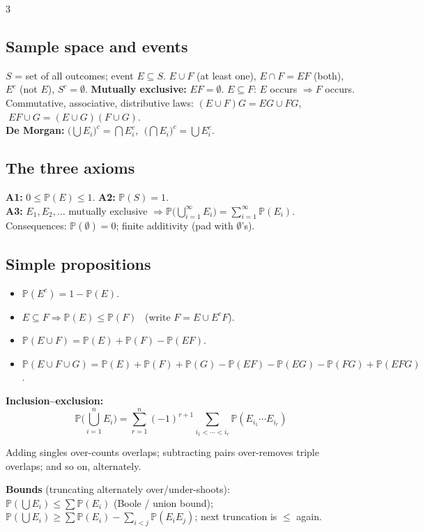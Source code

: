 \documentclass[8pt]{extarticle}
\newcommand{\PP}{\mathbb{P}}
\begin{document}
\begin{multicols*}{3}
\subsection{Sample space and events}
$S$ = set of all outcomes; event $E\subseteq S$. $E\cup F$ (at least one), $E\cap F=EF$ (both), $E^c$ (not $E$), $S^c=\emptyset$. \textbf{Mutually exclusive:} $EF=\emptyset$. $E\subseteq F$: $E$ occurs $\Rightarrow F$ occurs.\\
Commutative, associative, distributive laws: $(E\cup F)G=EG\cup FG$, $\;EF\cup G=(E\cup G)(F\cup G)$.\\
\textbf{De Morgan:} $\big(\bigcup E_i\big)^c=\bigcap E_i^c$, $\;\big(\bigcap E_i\big)^c=\bigcup E_i^c$.

\subsection{The three axioms}
\textbf{A1:} $0\le \PP(E)\le1$. \quad\textbf{A2:} $\PP(S)=1$.\\
\textbf{A3:} $E_1,E_2,\dots$ mutually exclusive $\Rightarrow\PP\big(\bigcup_{i=1}^\infty E_i\big)=\sum_{i=1}^\infty\PP(E_i)$.\\
Consequences: $\PP(\emptyset)=0$; finite additivity (pad with $\emptyset$'s).

\subsection{Simple propositions}
\begin{itemize}
\item $\PP(E^c)=1-\PP(E)$.
\item $E\subseteq F\Rightarrow \PP(E)\le\PP(F)$ \ (write $F=E\cup E^cF$).
\item $\PP(E\cup F)=\PP(E)+\PP(F)-\PP(EF)$.
\item $\PP(E\cup F\cup G)=\PP(E)+\PP(F)+\PP(G)-\PP(EF)-\PP(EG)-\PP(FG)+\PP(EFG)$.
\end{itemize}
\textbf{Inclusion--exclusion:}
\[\PP\Big(\bigcup_{i=1}^nE_i\Big)=\sum_{r=1}^n(-1)^{r+1}\!\!\sum_{i_1<\cdots<i_r}\!\!\PP(E_{i_1}\cdots E_{i_r})\]
\begin{idea}Adding singles over-counts overlaps; subtracting pairs over-removes triple overlaps; and so on, alternately.\end{idea}
\textbf{Bounds} (truncating alternately over/under-shoots):\\
$\PP(\bigcup E_i)\le\sum\PP(E_i)$ (Boole / union bound);\\
$\PP(\bigcup E_i)\ge\sum\PP(E_i)-\sum_{i<j}\PP(E_iE_j)$; next truncation is $\le$ again.


\end{multicols*}
\end{document}
